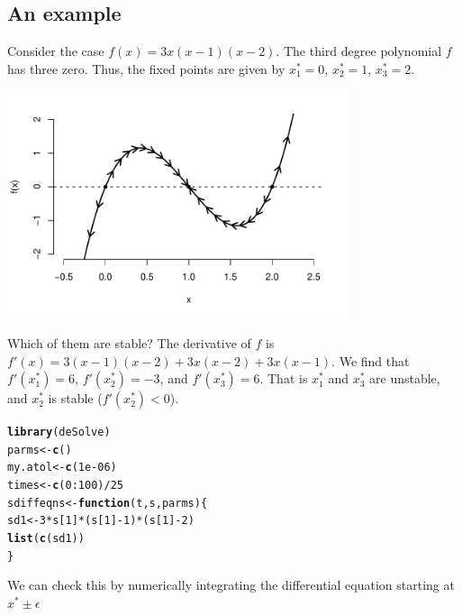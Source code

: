 \documentclass[a4paper]{article}\usepackage[]{graphicx}\usepackage[]{color}
\makeatletter
\newcommand{\hlnum}[1]{\textcolor[rgb]{0.686,0.059,0.569}{#1}}%
\newcommand{\hlopt}[1]{\textcolor[rgb]{0,0,0}{#1}}%
\newcommand{\hlstd}[1]{\textcolor[rgb]{0.345,0.345,0.345}{#1}}%
\newcommand{\hlkwa}[1]{\textcolor[rgb]{0.161,0.373,0.58}{\textbf{#1}}}%
\newcommand{\hlkwb}[1]{\textcolor[rgb]{0.69,0.353,0.396}{#1}}%
\newcommand{\hlkwc}[1]{\textcolor[rgb]{0.333,0.667,0.333}{#1}}%
\newcommand{\hlkwd}[1]{\textcolor[rgb]{0.737,0.353,0.396}{\textbf{#1}}}%
\newenvironment{kframe}{%
 \def\at@end@of@kframe{}%
 \ifinner\ifhmode%
  \def\at@end@of@kframe{\end{minipage}}%
  \begin{minipage}{\columnwidth}%
 \fi\fi%
 \def\FrameCommand##1{\hskip\@totalleftmargin \hskip-\fboxsep
 \colorbox{shadecolor}{##1}\hskip-\fboxsep
     \hskip-\linewidth \hskip-\@totalleftmargin \hskip\columnwidth}%
 \MakeFramed {\advance\hsize-\width
   \@totalleftmargin\z@ \linewidth\hsize
   \@setminipage}}%
 {\par\unskip\endMakeFramed%
 \at@end@of@kframe}
\newenvironment{knitrout}{}{} %
\makeatother
\begin{document}
	\subsection{An example}
	Consider the case $f(x)=3x(x-1)(x-2)$. The third degree polynomial $f$ has three zero. Thus, the fixed points are given by $x_1^*=0$, $x_2^*=1$, $x_3^*=2$.
	\begin{center}
		\includegraphics[width=10cm]{tutorial-p1.pdf}
	\end{center}
	
	Which of them are stable? The derivative of $f$ is $f'(x)=3(x-1)(x-2) + 3x(x-2) + 3x(x-1)$. We find that $f'(x_1^*)=6 $, $f'(x_2^*)=-3$, and $f'(x_3^*)=6$. That is $x_1^*$ and $x_3^*$ are unstable, and $x_2^*$ is stable ($f'(x_2^*) < 0$).

\begin{knitrout}
\color{fgcolor}\begin{kframe}
\begin{alltt}
\hlkwd{library}\hlstd{(deSolve)}
\hlstd{parms} \hlkwb{<-} \hlkwd{c}\hlstd{()}
\hlstd{my.atol} \hlkwb{<-} \hlkwd{c}\hlstd{(}\hlnum{1e-06}\hlstd{)}
\hlstd{times} \hlkwb{<-} \hlkwd{c}\hlstd{(}\hlnum{0}\hlopt{:}\hlnum{100}\hlstd{)}\hlopt{/}\hlnum{25}
\hlstd{sdiffeqns} \hlkwb{<-} \hlkwa{function}\hlstd{(}\hlkwc{t}\hlstd{,} \hlkwc{s}\hlstd{,} \hlkwc{parms}\hlstd{) \{}
    \hlstd{sd1} \hlkwb{<-} \hlnum{3} \hlopt{*} \hlstd{s[}\hlnum{1}\hlstd{]} \hlopt{*} \hlstd{(s[}\hlnum{1}\hlstd{]} \hlopt{-} \hlnum{1}\hlstd{)} \hlopt{*} \hlstd{(s[}\hlnum{1}\hlstd{]} \hlopt{-} \hlnum{2}\hlstd{)}
    \hlkwd{list}\hlstd{(}\hlkwd{c}\hlstd{(sd1))}
\hlstd{\}}
\end{alltt}
\end{kframe}
\end{knitrout}

We can check this by numerically integrating the differential equation starting at $x^{*}\pm\epsilon$
\end{document}
